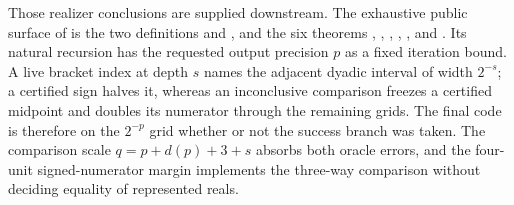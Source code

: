 \documentclass[11pt,oneside]{article}
\theoremstyle{definition}
\theoremstyle{remark}
\begin{document}
Those realizer conclusions are supplied downstream.  The exhaustive public
surface of  is the two definitions
 and , and the
six theorems
,
,
,
,
, and
.  Its natural recursion has the
requested output precision \(p\) as a fixed iteration bound.  A live bracket
index at depth \(s\) names the adjacent dyadic interval of width \(2^{-s}\);
a certified sign halves it, whereas an inconclusive comparison freezes a
certified midpoint and doubles its numerator through the remaining grids.
The final code is therefore on the \(2^{-p}\) grid whether or not the success
branch was taken.  The comparison scale \(q=p+d(p)+3+s\) absorbs both oracle
errors, and the four-unit signed-numerator margin implements the three-way
comparison without deciding equality of represented reals.
\end{document}
